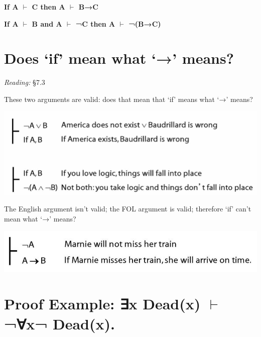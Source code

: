 \documentclass[12pt]{extarticle}
\begin{document}
\begin{multicols*}{3}
\textbf{If A $\vdash$ C then A $\vdash$ B→C}
 
\textbf{If A $\vdash$ B and A $\vdash$ ¬C then A $\vdash$ ¬(B→C)}
 
 
 
\section{Does ‘if’ mean what ‘→’ means?}
 
\emph{Reading:} §7.3
 
\begin{minipage}{\columnwidth}
 
These two arguments are valid: does that mean that `if' means what `→' means?
 
\begin{center}
\includegraphics[scale=0.3]{img/if_is_arrow.png}
\end{center}
\end{minipage}
 
\begin{minipage}{\columnwidth}
 
The English argument isn't valid; the FOL argument is valid; therefore `if' can't mean what `→' means?
 
\begin{center}
\includegraphics[scale=0.3]{img/if_aint_arrow.png}
\end{center}
\end{minipage}
 
 
 
\section{Proof Example: ∃x Dead(x) $\vdash$ ¬∀x¬ Dead(x).}
 

\end{multicols*}
\end{document}
